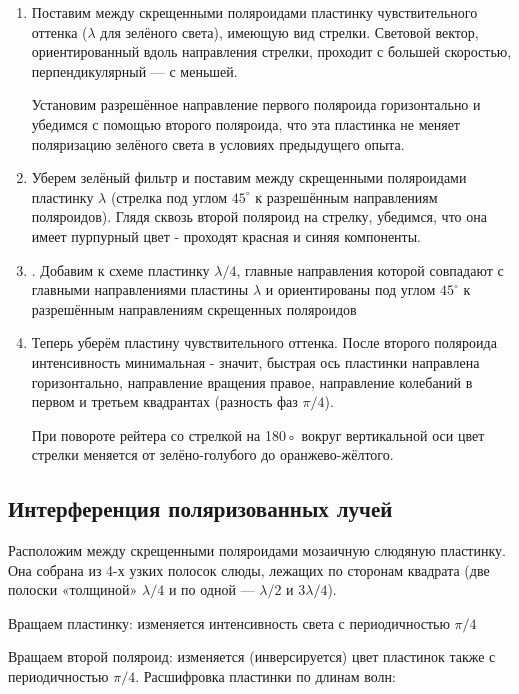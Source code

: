 \documentclass[15pt,a5paper,reqno]{article}
\begin{document}
\begin{enumerate}
    \item Поставим между скрещенными поляроидами пластинку чувствительного оттенка ($\lambda$ для зелёного света), имеющую вид стрелки. Световой вектор, ориентированный вдоль направления стрелки, проходит с большей скоростью, перпендикулярный — с меньшей. \par
Установим разрешённое направление первого поляроида горизонтально и убедимся с помощью второго поляроида, что эта пластинка
не меняет поляризацию зелёного света в условиях предыдущего опыта.
\begin{figure}[h!]
\end{figure}
\item Уберем зелёный фильтр
и поставим между скрещенными поляроидами
пластинку $\lambda$ (стрелка под углом $45^{\circ}$ к разрешённым направлениям поляроидов).
Глядя сквозь второй поляроид на стрелку, убедимся, что она имеет пурпурный цвет - проходят красная и синяя компоненты.
\item . Добавим
к схеме пластинку $\lambda/4$, главные направления
которой совпадают с главными направлениями пластины $\lambda$ и ориентированы под
углом $45^{\circ}$ к разрешённым направлениям скрещенных поляроидов

\item Теперь уберём пластину чувствительного оттенка. После второго поляроида интенсивность минимальная - значит, быстрая ось пластинки направлена горизонтально, направление вращения правое, направление колебаний в первом и третьем квадрантах (разность фаз $\pi/4$). \par
При повороте рейтера со стрелкой на 180◦ вокруг вертикальной оси
цвет стрелки меняется от зелёно-голубого до оранжево-жёлтого.

\end{enumerate}


\subsection{Интерференция поляризованных лучей}

Расположим между скрещенными поляроидами мозаичную слюдяную пластинку. Она собрана из 4-х узких полосок слюды, лежащих по сторонам квадрата (две полоски «толщиной» $\lambda/4$ и по одной — $\lambda/2$ и $3\lambda/4$).
\par Вращаем пластинку: изменяется интенсивность света с периодичностью $\pi/4$
\par Вращаем второй поляроид: изменяется (инверсируется) цвет пластинок также с периодичностью  $\pi/4$. Расшифровка пластинки по длинам волн:
\end{document}
